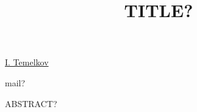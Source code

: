 \title{TITLE?}

\underline{I. Temelkov} 

{\normalsize{\vspace{-4mm}
\unisofia

\email mail?}}

ABSTRACT?

\vspace{\baselineskip} 